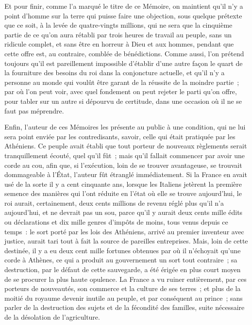 \documentclass[french,twoside]{book} %
\begin{document}
Et pour finir, comme l’a marqué le titre de ce Mémoire, on maintient qu’il n’y a point d’homme sur la terre qui puisse faire une objection, sous quelque prétexte que ce soit, à la levée de quatre-vingts millions, qui ne sera que la cinquième partie de ce qu’on aura rétabli par trois heures de travail au peuple, sans un ridicule complet, et sans être en horreur à Dieu et aux hommes, pendant que cette offre est, au contraire, comblée de bénédictions. Comme aussi, l’on prétend toujours qu’il est pareillement impossible d’établir d’une autre façon le quart de la fourniture des besoins du roi dans la conjoncture actuelle, et qu’il n’y a personne au monde qui voulût être garant de la réussite de la moindre partie ; par où l’on peut voir, avec quel fondement on peut rejeter le parti qu’on offre, pour tabler sur un autre si dépourvu de certitude, dans une occasion où il ne se faut pas méprendre.\par
Enfin, l’auteur de ces Mémoires les présente au public à une condition, qui ne lui sera point enviée par les contredisants, savoir, celle qui était pratiquée par les Athéniens. Ce peuple avait établi que tout porteur de nouveaux règlements serait tranquillement écouté, quel qu’il fût ; mais qu’il fallait commencer par avoir une corde au cou, afin que, si l’exécution, loin de se trouver avantageuse, se trouvait dommageable à l’État, l’auteur fût étranglé immédiatement. Si la France en avait usé de la sorte il y a cent cinquante ans, lorsque les Italiens jetèrent la première semence des manières qui l’ont réduite en l’état où elle se trouve aujourd’hui, le roi aurait, certainement, deux cents millions de revenu réglé plus qu’il n’a aujourd’hui, et ne devrait pas un sou, parce qu’il y aurait deux cents mille édits ou déclarations et dix mille genres d’impôts de moins, tous venus depuis ce temps : le sort porté par les lois des Athéniens, arrivé au premier inventeur avec justice, aurait tari tout à fait la source de pareilles entreprises. Mais, loin de cette destinée, il y a eu deux cent mille fortunes obtenues par où il n’échoyait qu’une corde à Athènes, ce qui a produit au gouvernement un sort tout contraire ; sa destruction, par le défaut de cette sauvegarde, a été érigée en plus court moyen de se procurer la plus haute opulence. La France a vu ruiner entièrement, par ces porteurs de nouveautés, son commerce et la culture de ses terres ; et plus de la moitié du royaume devenir inutile au peuple, et par conséquent au prince ; sans parler de la destruction des sujets et de la fécondité des familles, suite nécessaire de la désolation de l’agriculture.\par
\end{document}
